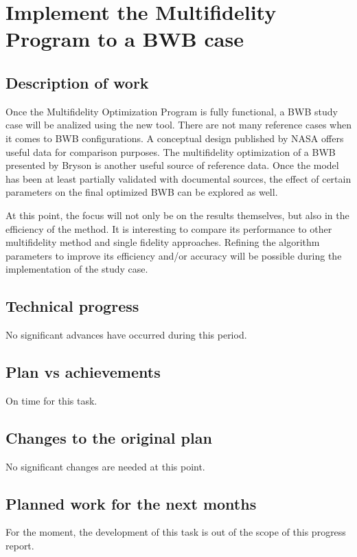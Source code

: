 \section{Implement the Multifidelity Program to a BWB case}
\label{sec:task2}
\subsection{Description of work}
Once the Multifidelity Optimization Program is fully functional, a BWB study case will be analized using the new tool. There are not many reference cases when it comes to BWB configurations. A conceptual design \cite{Quinlan2019} published by NASA  offers useful data for comparison purposes. The multifidelity optimization of a BWB presented by Bryson \cite{Bryson2019a} is another useful source of reference data. Once the model has been at least partially validated with documental sources, the effect of certain parameters on the final optimized BWB can be explored as well. 

At this point, the focus will not only be on the results themselves, but also in the efficiency of the method. It is interesting to compare its performance to other multifidelity method and single fidelity approaches. Refining the algorithm parameters to improve its efficiency and/or accuracy will be possible during the implementation of the study case. 
\subsection{Technical progress}
No significant advances have occurred during this period.
\subsection{Plan vs achievements}
On time for this task.
\subsection{Changes to the original plan}
No significant changes are needed at this point.
\subsection{Planned work for the next months}
For the moment, the development of this task is out of the scope of this progress report.

